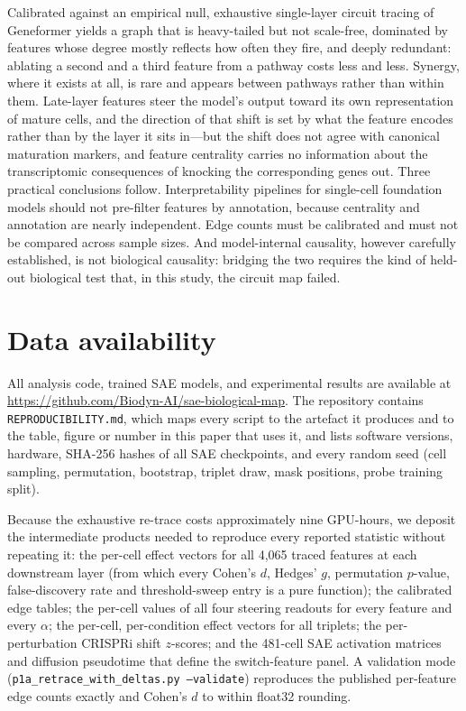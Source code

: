 \documentclass[11pt,onecolumn]{article}
\begin{document}
Calibrated against an empirical null, exhaustive single-layer circuit tracing of Geneformer yields a graph that is heavy-tailed but not scale-free, dominated by features whose degree mostly reflects how often they fire, and deeply redundant: ablating a second and a third feature from a pathway costs less and less. Synergy, where it exists at all, is rare and appears between pathways rather than within them. Late-layer features steer the model's output toward its own representation of mature cells, and the direction of that shift is set by what the feature encodes rather than by the layer it sits in---but the shift does not agree with canonical maturation markers, and feature centrality carries no information about the transcriptomic consequences of knocking the corresponding genes out. Three practical conclusions follow. Interpretability pipelines for single-cell foundation models should not pre-filter features by annotation, because centrality and annotation are nearly independent. Edge counts must be calibrated and must not be compared across sample sizes. And model-internal causality, however carefully established, is not biological causality: bridging the two requires the kind of held-out biological test that, in this study, the circuit map failed.

\section{Data availability}
\label{sec:data_availability}

All analysis code, trained SAE models, and experimental results are available at \url{https://github.com/Biodyn-AI/sae-biological-map}. The repository contains \texttt{REPRODUCIBILITY.md}, which maps every script to the artefact it produces and to the table, figure or number in this paper that uses it, and lists software versions, hardware, SHA-256 hashes of all SAE checkpoints, and every random seed (cell sampling, permutation, bootstrap, triplet draw, mask positions, probe training split).

Because the exhaustive re-trace costs approximately nine GPU-hours, we deposit the intermediate products needed to reproduce every reported statistic without repeating it: the per-cell effect vectors for all 4{,}065 traced features at each downstream layer (from which every Cohen's $d$, Hedges' $g$, permutation $p$-value, false-discovery rate and threshold-sweep entry is a pure function); the calibrated edge tables; the per-cell values of all four steering readouts for every feature and every $\alpha$; the per-cell, per-condition effect vectors for all triplets; the per-perturbation CRISPRi shift $z$-scores; and the 481-cell SAE activation matrices and diffusion pseudotime that define the switch-feature panel. A validation mode (\texttt{p1a\_retrace\_with\_deltas.py --validate}) reproduces the published per-feature edge counts exactly and Cohen's $d$ to within float32 rounding.
\end{document}
